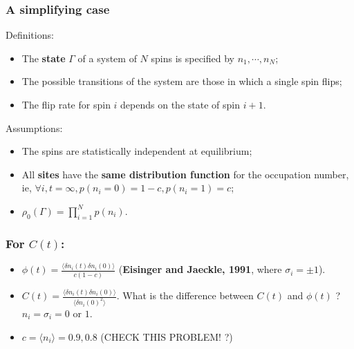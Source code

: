 \documentclass[8pt]{beamer}
\begin{document}
\begin{frame}
	\frametitle{A simplifying case}
	Definitions:
	\begin{itemize}
		\item The \textbf{state} $\Gamma$ of a system of $N$ spins is specified by $n_1 ,\cdots,n_N$;
		\item The possible transitions of the system are those in which
		a single spin flips; 
		\item The flip rate for spin $i$ depends on the state of  spin $i+1$.
	\end{itemize}	
	Assumptions:
	\begin{itemize}
		\item The spins are statistically independent at equilibrium;
		\item  All \textbf{sites} have the \textbf{same distribution function} for the occupation number, ie, $\forall i,  t=\infty,  p(n_i=0)= 1-c, p(n_i =1) = c$;
		\item $\rho_0(\Gamma) = \prod_{i=1}^N p(n_i)$.
	\end{itemize}	
\end{frame}

\begin{frame}
	\frametitle{For $C(t)$:}
	\begin{itemize}
		\item $\phi(t) = \frac{\langle \delta n_i(t) \delta n_i(0)\rangle}{c(1-c)}$ (\textbf{Eisinger and Jaeckle, 1991}, where $\sigma_i =\pm 1$).
		\item   $C(t) = \frac{\langle\delta n_i(t)\delta n_i (0)\rangle}{\langle \delta n_i(0)^2 \rangle}$. What is the difference between $C(t)$ and $\phi(t)$ ? $n_i = \sigma_i = 0 \text{ or } 1$.
		\item $c=\langle n_i \rangle =0.9, 0.8$ (CHECK THIS PROBLEM! ?)
	\end{itemize}	
\end{frame}
\end{document}
